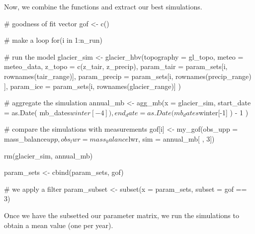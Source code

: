 Now, we combine the functions and extract our best simulations.

\begin{example}
# goodness of fit vector
gof <- c()

# make a loop
for(i in 1:n_run){

  # run the model
  glacier_sim <- glacier_hbv(topography = gl_topo,
                             meteo = meteo_data,
                             z_topo = c(z_tair, z_precip),
                             param_tair = param_sets[i, rownames(tair_range)],
                             param_precip = param_sets[i, rownames(precip_range) ],
                             param_ice = param_sets[i, rownames(glacier_range)] )

  # aggregate the simulation
  annual_mb <- agg_mb(x = glacier_sim,
                      start_date = as.Date( mb_dates$winter[-4] ),
                      end_date = as.Date( mb_dates$winter[-1] ) - 1 )

  # compare the simulations with measurements
  gof[i] <- my_gof(obs_upp = mass_balance$upp,
                   obs_lwr = mass_balance$lwr,
                   sim = annual_mb[ , 3])

  rm(glacier_sim, annual_mb)
}

param_sets <- cbind(param_sets, gof)

# we apply a filter
param_subset <- subset(x = param_sets, subset = gof == 3)
\end{example}

Once we have the subsetted our parameter matrix, we run the simulations to obtain a mean value (one per year).


